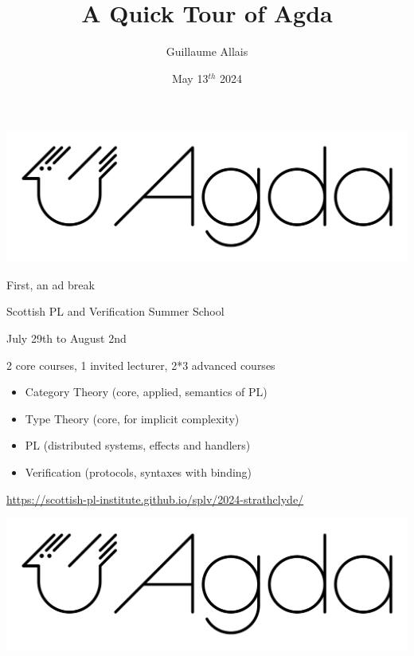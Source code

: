 \documentclass{beamer}
\title{A Quick Tour of Agda}
\author{Guillaume Allais}
\institute{Hausdorff Research Institute for Mathematics}
\date{May 13$^{th}$ 2024}
\begin{document}
\begin{frame}
    \begin{center}
      \includegraphics[width=.5\textwidth]{agda-logo.png}
    \end{center}
    \maketitle
\end{frame}

\begin{frame}{First, an ad break}

  {\Large Scottish PL and Verification Summer School}

  {\large July 29th to August 2nd}

  \bigskip

  2 core courses, 1 invited lecturer, 2*3 advanced courses
  \begin{itemize}
    \item Category Theory (core, applied, semantics of PL)
    \item Type Theory (core, for implicit complexity)
    \item PL (distributed systems, effects and handlers)
    \item Verification (protocols, syntaxes with binding)
  \end{itemize}

  \bigskip

  \url{https://scottish-pl-institute.github.io/splv/2024-strathclyde/}

\end{frame}

\begin{frame}
    \begin{center}
      \includegraphics[width=.5\textwidth]{agda-logo.png}
    \end{center}
    \maketitle
\end{frame}
\end{document}

